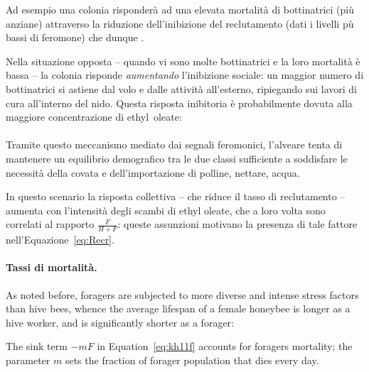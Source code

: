Ad esempio una colonia risponderà ad una elevata mortalità di bottinatrici (più anziane) attraverso
la riduzione dell'inibizione del reclutamento (dati i livelli pù bassi di feromone) che dunque
.

Nella situazione opposta -- \ie quando vi sono molte bottinatrici e la loro mortalità è bassa -- la colonia
risponde \emph{aumentando} l'inibizione sociale: un maggior numero di bottinatrici si astiene dal volo e
dalle attività all'esterno, ripiegando sui lavori di cura all'interno del nido. Questa risposta inibitoria
è probabilmente dovuta alla maggiore concentrazione di ethyl~oleate:

\paragraph{}
Tramite questo meccanismo mediato dai segnali feromonici, l'alveare tenta di mantenere un equilibrio
demografico tra le due classi sufficiente a soddisfare le necessità della covata e dell'importazione
di polline, nettare, acqua.

In questo scenario la risposta collettiva -- che riduce il tasso di reclutamento -- aumenta con
l'intensità degli scambi di ethyl oleate, che a loro volta sono correlati al rapporto $\frac{F}{H+F}$:
queste assunzioni motivano la presenza di tale fattore nell'Equazione~\eqref{eq:Recr}.


\paragraph{Tassi di mortalità.}
As noted before, foragers are subjected to more diverse and intense stress factors than hive bees, whence the average lifespan of a female honeybee is longer as a hive worker, and is significantly shorter as a forager: 

The sink term $-mF$ in Equation~\eqref{eq:kh11f} accounts for foragers mortality;
the parameter $m$ sets the fraction of forager population that dies every day.

